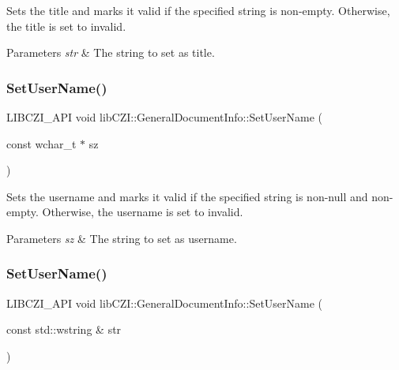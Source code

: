 Sets the title and marks it valid if the specified string is non-\/empty. Otherwise, the title is set to invalid.


\begin{DoxyParams}{Parameters}
{\em str} & The string to set as title. \\
\hline
\end{DoxyParams}
\mbox{\label{structlib_c_z_i_1_1_general_document_info_a43ecc2bfab87e68916893d5520845fe1}} 
\subsubsection{\texorpdfstring{Set\+User\+Name()}{SetUserName()}\hspace{0.1cm}{\footnotesize\ttfamily [1/2]}}
{\footnotesize\ttfamily L\+I\+B\+C\+Z\+I\+\_\+\+A\+PI void lib\+C\+Z\+I\+::\+General\+Document\+Info\+::\+Set\+User\+Name (\begin{DoxyParamCaption}\item[{const wchar\+\_\+t $\ast$}]{sz }\end{DoxyParamCaption})\hspace{0.3cm}{\ttfamily [inline]}}

Sets the username and marks it valid if the specified string is non-\/null and non-\/empty. Otherwise, the username is set to invalid.


\begin{DoxyParams}{Parameters}
{\em sz} & The string to set as username. \\
\hline
\end{DoxyParams}
\mbox{\label{structlib_c_z_i_1_1_general_document_info_a20eceeaadb42b66a2d3d022a5f0e2c98}} 
\subsubsection{\texorpdfstring{Set\+User\+Name()}{SetUserName()}\hspace{0.1cm}{\footnotesize\ttfamily [2/2]}}
{\footnotesize\ttfamily L\+I\+B\+C\+Z\+I\+\_\+\+A\+PI void lib\+C\+Z\+I\+::\+General\+Document\+Info\+::\+Set\+User\+Name (\begin{DoxyParamCaption}\item[{const std\+::wstring \&}]{str }\end{DoxyParamCaption})\hspace{0.3cm}{\ttfamily [inline]}}

